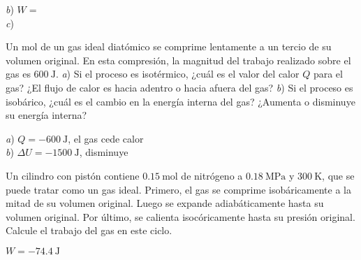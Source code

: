 \begin{Answer}
	\begin{minipage}[t]{.4\textwidth}
    \textit{b}) $W = $\\ \textit{c}) 
  \end{minipage}
\end{Answer}
%
\begin{Exercise}
  Un mol de un gas ideal diatómico se comprime lentamente a un tercio de su volumen original. En esta compresión, la magnitud del trabajo realizado sobre el gas es $\SI{600}{\joule}$. \textit{a}) Si el proceso es isotérmico, ¿cuál es el valor del calor $Q$ para el gas? ¿El flujo de calor es hacia adentro o hacia afuera del gas? \textit{b}) Si el proceso es isobárico, ¿cuál es el cambio en la energía interna del gas? ¿Aumenta o disminuye su energía interna?
\end{Exercise}
\begin{Answer}
	\begin{minipage}[t]{.4\textwidth}
    \textit{a}) $Q = \SI{-600}{\joule}$, el gas cede calor\\ \textit{b}) $\Delta U = \SI{-1500}{\joule}$, disminuye
  \end{minipage}
\end{Answer}
%
\begin{Exercise}
  Un cilindro con pistón contiene $\SI{0.15}{\mole}$ de nitrógeno a $\SI{0.18}{\mega\pascal}$ y $\SI{300}{\kelvin}$, que se puede tratar como un gas ideal. Primero, el gas se comprime isobáricamente a la mitad de su volumen original. Luego se expande adiabáticamente hasta su volumen original. Por último, se calienta isocóricamente hasta su presión original. Calcule el trabajo del gas en este ciclo.
\end{Exercise}
\begin{Answer}
	\begin{minipage}[t]{.4\textwidth}
    $W = \SI{-74.4}{\joule}$
  \end{minipage}
\end{Answer}
%

